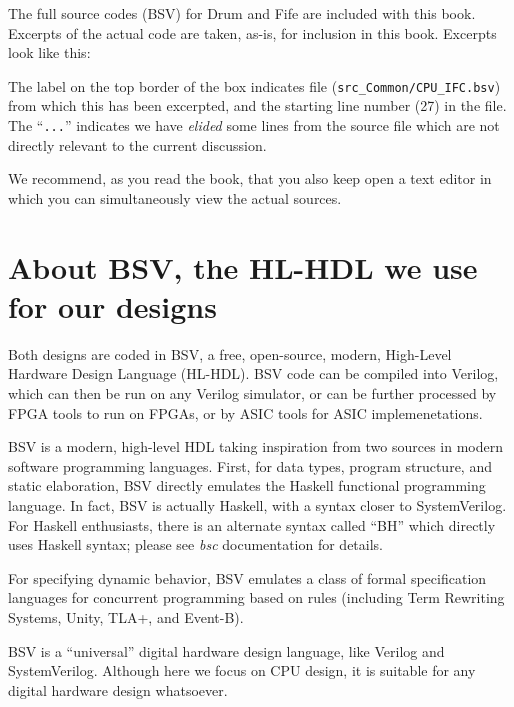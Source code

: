 The full source codes (BSV) for Drum and Fife are included with this
book.  Excerpts of the actual code are taken, as-is, for inclusion in
this book.  Excerpts look like this:


The label on the top border of the box indicates file
(\verb|src_Common/CPU_IFC.bsv|) from which this has been excerpted,
and the starting line number (27) in the file.  The ``\verb|...|''
indicates we have \emph{elided} some lines from the source file which
are not directly relevant to the current discussion.

We recommend, as you read the book, that you also keep open a text
editor in which you can simultaneously view the actual sources.


\section{About BSV, the HL-HDL we use for our designs}

Both designs are coded in BSV, a free, open-source, modern, High-Level
Hardware Design Language (HL-HDL).  BSV code can be compiled into
Verilog, which can then be run on any Verilog simulator, or can be
further processed by FPGA tools to run on FPGAs, or by ASIC tools for
ASIC implemenetations.


BSV is a modern, high-level HDL taking inspiration from two sources in
modern software programming languages.  First, for data types, program
structure, and static elaboration, BSV directly emulates the Haskell
functional programming language.  In fact, BSV is actually Haskell,
with a syntax closer to SystemVerilog.  For Haskell enthusiasts, there
is an alternate syntax called ``BH'' which directly uses Haskell
syntax; please see \emph{bsc} documentation for details.

For specifying dynamic behavior, BSV emulates a class of formal
specification languages for concurrent programming based on rules
(including Term Rewriting Systems, Unity, TLA+, and Event-B).

BSV is a ``universal'' digital hardware design language, like Verilog
and SystemVerilog.  Although here we focus on CPU design, it is
suitable for any digital hardware design whatsoever.

